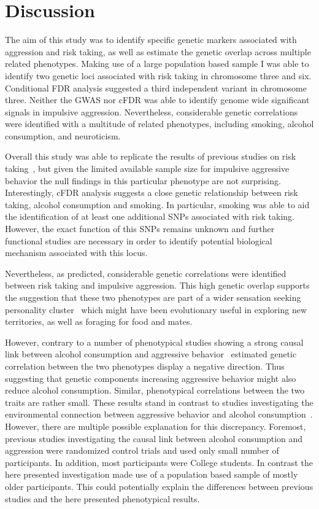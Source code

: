 \section{Discussion}
\label{sec:ukb_assc_discussion}

The aim of this study was to identify specific genetic markers associated with aggression and risk taking,
as well as estimate the genetic overlap across multiple related phenotypes.
Making use of a large population based sample I was able to identify two genetic loci associated with risk taking in chromosome three and six.
Conditional FDR analysis suggested a third independent variant in chromosome three.
Neither the GWAS nor cFDR was able to identify genome wide significant signals in impulsive aggression.
Nevertheless, considerable genetic correlations were identified with a multitude of related phenotypes, including smoking, alcohol consumption, and neuroticism.

Overall this study was able to replicate the results of previous studies on risk taking~\cite{Day2016}, but given the limited available sample size for impulsive aggressive behavior the null findings in this particular phenotype are not surprising.
Interestingly, cFDR analysis suggests a close genetic relationship between risk taking, alcohol consumption and smoking.
In particular, smoking was able to aid the identification of at least one additional SNPs associated with risk taking.
However, the exact function of this SNPs remains unknown and further functional studies are necessary in order to identify potential biological mechanism associated with this locus.

Nevertheless, as predicted, considerable genetic correlations were identified between risk taking and impulsive aggression.
This high genetic overlap supports the suggestion that these two phenotypes are part of a wider sensation seeking personality cluster~\cite{Zuckerman2000} which might have been evolutionary useful in exploring new territories, as well as foraging for food and mates.

However, contrary to a number of phenotypical studies showing a strong causal link between alcohol consumption and aggressive behavior~\cite{FRANZKOWIAX1987,Zuckerman2000,Dakwar2011} estimated genetic correlation between the two phenotypes display a negative direction.
Thus suggesting that genetic components increasing aggressive behavior might also reduce alcohol consumption.
Similar, phenotypical correlations between the two traits are rather small.
These results stand in contrast to studies investigating the environmental connection between aggressive behavior and alcohol consumption~\cite{Bushman1990}.
However, there are multiple possible explanation for this discrepancy.
Foremost, previous studies investigating the causal link between alcohol consumption and aggression were randomized control trials and used only small number of participants.
In addition, most participants were College students.
In contrast the here presented investigation made use of a population based sample of mostly older participants.
This could potentially explain the differences between previous studies and the here presented phenotypical results.


